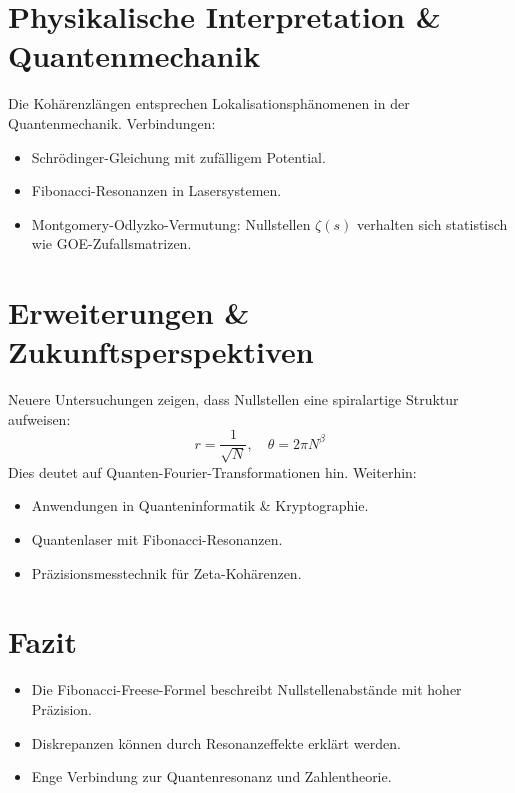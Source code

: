 \documentclass[a4paper,11pt]{article}
\begin{document}
\section{Physikalische Interpretation \& Quantenmechanik}
Die Kohärenzlängen entsprechen Lokalisationsphänomenen in der Quantenmechanik. Verbindungen:
\begin{itemize}
    \item Schrödinger-Gleichung mit zufälligem Potential.
    \item Fibonacci-Resonanzen in Lasersystemen.
    \item Montgomery-Odlyzko-Vermutung: Nullstellen $\zeta(s)$ verhalten sich statistisch wie GOE-Zufallsmatrizen.
\end{itemize}

\section{Erweiterungen \& Zukunftsperspektiven}
Neuere Untersuchungen zeigen, dass Nullstellen eine spiralartige Struktur aufweisen:
\begin{equation}
    r = \frac{1}{\sqrt{N}}, \quad \theta = 2\pi N^{\beta}
\end{equation}
Dies deutet auf Quanten-Fourier-Transformationen hin. Weiterhin:
\begin{itemize}
    \item Anwendungen in Quanteninformatik \& Kryptographie.
    \item Quantenlaser mit Fibonacci-Resonanzen.
    \item Präzisionsmesstechnik für Zeta-Kohärenzen.
\end{itemize}

\section{Fazit}
\begin{itemize}
    \item Die Fibonacci-Freese-Formel beschreibt Nullstellenabstände mit hoher Präzision.
    \item Diskrepanzen können durch Resonanzeffekte erklärt werden.
    \item Enge Verbindung zur Quantenresonanz und Zahlentheorie.
\end{itemize}
\end{document}
